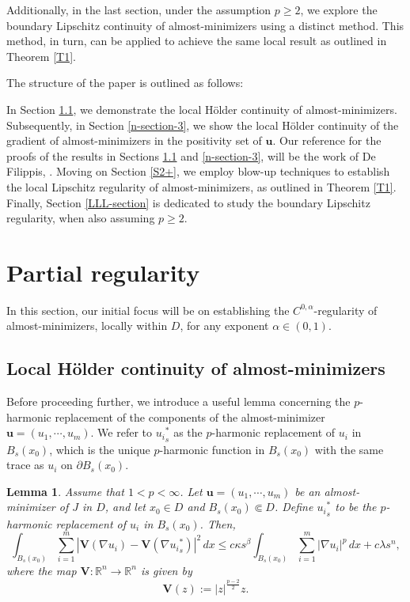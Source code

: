 \documentclass{amsart}
\newtheorem{lemma}[theorem]{Lemma}
\begin{document}
Additionally, in the last section, under the assumption $p \geq 2$, we explore the boundary Lipschitz continuity of almost-minimizers using a distinct method. This method, in turn, can be applied to achieve the same local result as outlined in Theorem \ref{T1}.

\medskip

The structure of the paper is outlined as follows:

In Section \ref{S2}, we demonstrate the local H\"older continuity of almost-minimizers. Subsequently, in Section \ref{n-section-3}, we show the local H\"older continuity of the gradient of almost-minimizers in the positivity set of $\mathbf{u}$.
Our reference for the proofs of the results in Sections \ref{S2} and \ref{n-section-3}, will be the work of De Filippis, \cite{de2020regularity}.
Moving on Section \ref{S2+}, we employ blow-up techniques to establish the local Lipschitz regularity of almost-minimizers, as outlined in Theorem \ref{T1}. Finally, Section \ref{LLL-section} is dedicated to study the boundary Lipschitz regularity, when also assuming $p\geq 2$.


\section{Partial regularity}
\label{M-S2}


In this section, our initial focus will be on establishing the $C^{0,\alpha}$-regularity of almost-minimizers, locally within $D$, for any exponent $\alpha \in (0,1)$.

\subsection{Local H\"older continuity of almost-minimizers}
\label{S2}

Before proceeding further, we introduce a useful lemma concerning the $p$-harmonic replacement of the components of the almost-minimizer $\mathbf{u}=(u_1, \cdots, u_m)$. We refer to ${u_i}^{*}_s$ as the $p$-harmonic replacement of ${u_i}$ in $B_s(x_0)$, which is the unique $p$-harmonic function in $B_s(x_0)$ with the same trace as ${u_i}$ on $\partial B_s(x_0)$.

\begin{lemma}
\label{Useful--Lemma}
Assume that $1<p<\infty$. Let $\mathbf{u}=(u_1, \cdots, u_m)$ be an almost-minimizer of $J$ in $D$, and let $x_0 \in D$ and $B_s(x_0) \Subset D$.
Define ${u_i}^{*}_s$ to be the $p$-harmonic replacement of ${u_i}$ in $B_s(x_0)$. Then,
\begin{equation}
\label{E4.5}
\int_{B_s(x_0)} \sum_{i=1}^{m} \left| \mathbf{V}(\nabla u_i) - \mathbf{V}(\nabla {u_i}^{*}_s) \right|^2 \, dx \leq c \kappa s^{\beta} \int_{B_{s}(x_0)} \sum_{i=1}^{m} \left|\nabla u_i \right|^p \, dx + c\lambda s^n,
\end{equation}
where the map $\mathbf{V}: \mathbb{R}^n \to \mathbb{R}^n$ is given by
\begin{equation}
\label{auxillary-map}
\mathbf{V}(z):= \left| z \right|^{\frac{p-2}{2}} z.
\end{equation}
\end{lemma}
\end{document}
